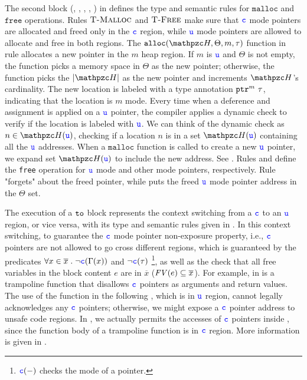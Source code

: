 The second block (, ,
, , ) in  defines
the type and semantic rules for $\texttt{malloc}$ and $\texttt{free}$ operations.
Rules $\rulelab{T-Malloc}$ and $\rulelab{T-Free}$ make sure that $\textcolor{blue}{\texttt{c}}$ mode pointers are allocated and freed only in the $\textcolor{blue}{\texttt{c}}$ region, while $\textcolor{blue}{\texttt{u}}$ mode pointers are allowed to allocate and free in both regions.
The $\mathtt{alloc}(\heap,\Theta,m,\tau)$ function in rule  allocates a new pointer in the $m$ heap region.
If $m$ is $\textcolor{blue}{\texttt{u}}$ and $\Theta$ is not empty, the function picks a memory space in $\Theta$ as the new pointer;
otherwise, the function picks the $|\heap|$ as the new pointer and increments $\heap$'s cardinality.
The new location is labeled with a type annotation $\mathtt{ptr}^{m}~{\tau}$, indicating that the location is $m$ mode.
Every time when a deference and assignment is applied on a $\textcolor{blue}{\texttt{u}}$ pointer, the \systemname compiler applies a dynamic check to verify if the location is labeled with $\textcolor{blue}{\texttt{u}}$.
We can think of the dynamic check as $n \in \heap(\umode)$, checking if a location $n$ is in a set $\heap(\umode)$ containing all the $\textcolor{blue}{\texttt{u}}$ addresses. When a $\texttt{malloc}$ function is called to create a new $\textcolor{blue}{\texttt{u}}$ pointer, we expand set $\heap(\umode)$ to include the new address. See .
Rules  and  define the \texttt{free} operation for $\textcolor{blue}{\texttt{u}}$ mode and other mode pointers, respectively.
Rule  "forgets" about the freed pointer, while  puts the freed $\textcolor{blue}{\texttt{u}}$ mode pointer address in the $\Theta$ set.

The execution of a $\mathtt{to}$ block represents 
the context switching from a $\textcolor{blue}{\texttt{c}}$ to an $\textcolor{blue}{\texttt{u}}$ region, or vice versa,
with its type and semantic rules given in .
In this context switching, to guarantee the $\textcolor{blue}{\texttt{c}}$ mode pointer non-exposure property, i.e.,
$\textcolor{blue}{\texttt{c}}$ pointers are not allowed to go cross different regions, which is guaranteed by the predicates 
$\forall x\in\overline{x}\;.\;\neg\textcolor{blue}{\texttt{c}}(\Gamma(x))$ and $\neg\textcolor{blue}{\texttt{c}}(\tau)$ \footnote{$\textcolor{blue}{\texttt{c}}(-)$ checks the mode of a pointer.},
as well as the check that all free variables in the block content $e$ are in $\overline{x}$ ($\mathit{FV}(e)\subseteq\overline{x}$).
For example,  in  is a trampoline function that disallows
$\textcolor{blue}{\texttt{c}}$ pointers as arguments and return values.
The use of the function in the following , which is in $\textcolor{blue}{\texttt{u}}$ region,
cannot legally acknowledges any $\textcolor{blue}{\texttt{c}}$ pointers; otherwise, we might expose a $\textcolor{blue}{\texttt{c}}$ pointer address to unsafe code regions.
In \lang, we actually permits the accesses of $\textcolor{blue}{\texttt{c}}$ pointers inside ,
since the function body of a trampoline function is in $\textcolor{blue}{\texttt{c}}$ region.
More information is given in .

